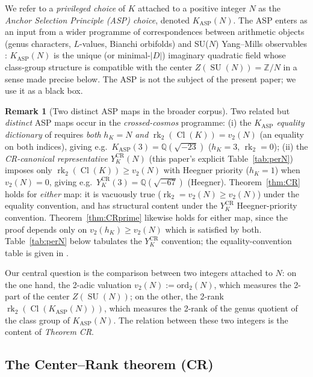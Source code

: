 \documentclass[11pt,a4paper,reqno]{amsart}
\theoremstyle{definition}
\newtheorem{remark}[theorem]{Remark}
\DeclareMathOperator{\SU}{SU}
\DeclareMathOperator{\Cl}{Cl}
\DeclareMathOperator{\rk}{rk}
\newcommand{\KASP}{K_{\mathrm{ASP}}}
\newcommand{\YKCR}{Y_K^{\mathrm{CR}}}
\newcommand{\ZZ}{\mathbb{Z}}
\newcommand{\QQ}{\mathbb{Q}}
\newcommand{\vtwo}{v_2}
\begin{document}
We refer to a \emph{privileged choice} of $K$ attached to a positive integer
$N$ as the \emph{Anchor Selection Principle (ASP) choice}, denoted $\KASP(N)$.
The ASP enters as an input from a wider programme of correspondences between
arithmetic objects (genus characters, $L$-values, Bianchi orbifolds) and
SU($N$) Yang--Mills observables \cite{Remondiere2026Survey,
Remondiere2026Selberg}: $\KASP(N)$ is the unique (or minimal-$|D|$)
imaginary quadratic field whose class-group structure is compatible with the
center $Z(\SU(N))=\ZZ/N$ in a sense made precise below. The ASP is not the
subject of the present paper; we use it as a black box.

\begin{remark}[Two distinct ASP maps in the broader corpus]\label{rem:ASP-conventions}
Two related but \emph{distinct} ASP maps occur in the \emph{crossed-cosmos}
programme: (i) the \emph{$\KASP$ equality dictionary} of
\cite{Remondiere2026KASPmini,Remondiere2026PRL} requires \emph{both}
$h_K = N$ \emph{and} $\rk_2(\Cl(K)) = v_2(N)$ (an equality on both indices),
giving e.g.\ $\KASP(3) = \QQ(\sqrt{-23})$ ($h_K=3$, $\rk_2=0$); (ii) the
\emph{CR-canonical representative $\YKCR(N)$} (this paper's
explicit Table~\ref{tab:perN}) imposes only $\rk_2(\Cl(K))\ge v_2(N)$ with
Heegner priority ($h_K=1$) when $v_2(N)=0$, giving e.g.\
$\YKCR(3) = \QQ(\sqrt{-67})$ (Heegner). Theorem~\ref{thm:CR} holds for
\emph{either} map: it is vacuously true ($\rk_2 = v_2(N) \ge v_2(N)$) under
the equality convention, and has structural content under the
$\YKCR$ Heegner-priority convention. Theorem~\ref{thm:CRprime} likewise
holds for either map, since the proof depends only on
$v_2(h_K) \ge v_2(N)$ which is satisfied by both. Table~\ref{tab:perN}
below tabulates the $\YKCR$ convention; the equality-convention table is
given in \cite{Remondiere2026KASPmini}.
\end{remark}

Our central question is the comparison between two integers attached to $N$:
on the one hand, the 2-adic valuation $\vtwo(N) := \mathrm{ord}_2(N)$, which
measures the 2-part of the center $Z(\SU(N))$; on the other, the 2-rank
$\rk_2(\Cl(\KASP(N)))$, which measures the 2-rank of the genus quotient of
the class group of $\KASP(N)$. The relation between these two integers is the
content of \emph{Theorem CR}.

\subsection{The Center--Rank theorem (CR)}\label{ss:CRintro}
\end{document}
